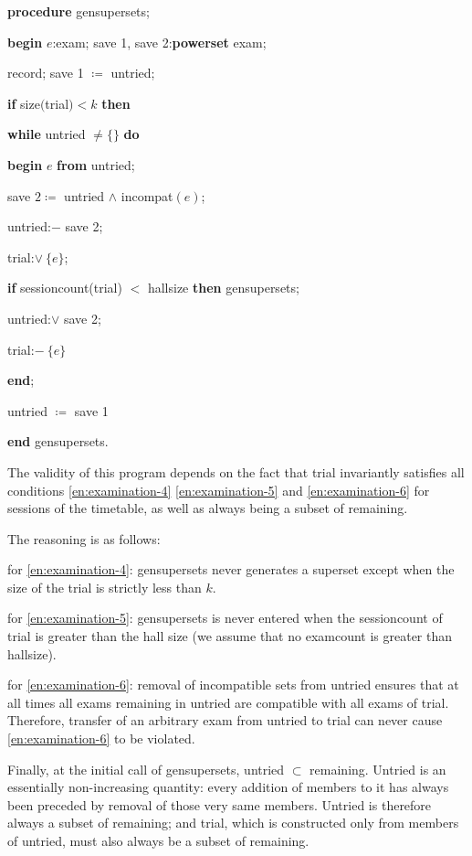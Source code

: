 \textbf{procedure} gensupersets;

\quad \textbf{begin} $e$:exam; save 1, save 2:\textbf{powerset} exam;

\quad \quad record; save 1 $\coloneq$ untried;

\quad \quad \textbf{if} size$($trial$) < k$ \textbf{then}

\quad \quad \textbf{while} untried $\neq \{\}$ \textbf{do}

\quad \quad \quad \textbf{begin} $e$ \textbf{from} untried;

\quad \quad \quad \quad save $2\coloneq$ untried $\wedge$ incompat$(e)$;

\quad \quad \quad \quad untried:$-$ save 2;

\quad \quad \quad \quad trial:$\vee\ \{e\}$;

\quad \quad \quad \quad \textbf{if} sessioncount(trial) $<$ hallsize \textbf{then} gensupersets;

\quad \quad \quad \quad untried:$\vee$ save 2;

\quad \quad \quad \quad trial:$-\ \{e\}$

\quad \quad \quad \textbf{end};

\quad \quad \quad untried $\coloneq$ save 1

\quad \textbf{end} gensupersets.

The validity of this program depends on the fact that trial invariantly satisfies all conditions \ref{en:examination-4} \ref{en:examination-5} and \ref{en:examination-6} for sessions of the timetable, as well as always being a subset of remaining.

The reasoning is as follows:

for \ref{en:examination-4}: gensupersets never generates a superset except when the size of the trial is strictly less than $k$.

for \ref{en:examination-5}: gensupersets is never entered when the sessioncount of trial is greater than the hall size (we assume that no examcount is greater than hallsize).

for \ref{en:examination-6}: removal of incompatible sets from untried ensures that at all times all exams remaining in untried are compatible with all exams of trial. Therefore, transfer of an arbitrary exam from untried to trial can never cause \ref{en:examination-6} to be violated.

Finally, at the initial call of gensupersets, untried $\subset$ remaining. Untried is an essentially non-increasing quantity: every addition of members to it has always been preceded by removal of those very same members. Untried is therefore always a subset of remaining; and trial, which is constructed only from members of untried, must also always be a subset of remaining.

